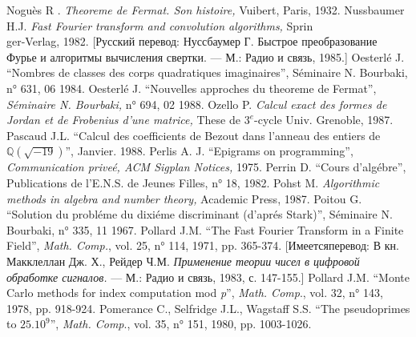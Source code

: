 \documentclass{mai_book}
\begin{document}
\noindent [136] Nogu\`{e}s R . {\itshape Theoreme de Fermat. Son histoire,} Vuibert, Paris, 1932.
\newline
[137] Nussbaumer H.J. {\itshape Fast Fourier transform and convolution algorithms,} Sprin\\ger-Verlag, 1982. [Русский перевод: Нуссбаумер Г. Быстрое преобразование Фурье и алгоритмы вычисления свертки. — М.: Радио и связь, 1985.]
\newline
[138] Oesterl\'{e} J. “Nombres de classes des corps quadratiques imaginaires”, S\'{e}minaire N. Bourbaki, n° 631, 06 1984.
\newline
\noindent[139] Oesterl\'{e} J. “Nouvelles approches du theoreme de Fermat”, {\itshape S\'{e}minaire N. Bourbaki,} n° 694, 02 1988.
\newline
[140] Ozello P. {\itshape Calcul exact des formes de Jordan et de Frobenius d’une matrice,} These de $3^{e}$-cycle Univ. Grenoble, 1987.
\newline
\noindent [141] Pascaud J.L. “Calcul des coefficients de Bezout dans l’anneau des entiers de $\mathbb{Q}(\sqrt{-19})$”, Janvier. 1988.
\newline
[142] Perlis A. J. “Epigrams on programming”, {\itshape Communication prive\'{e}, ACM Sigplan Notices,} 1975.
\newline
\noindent [143] Perrin D. “Cours d’alg\'{e}bre”, Publications de l’E.N.S. de Jeunes Filles, n° 18, 1982.
\newline
\noindent [144] Pohst M. {\itshape Algorithmic methods in algebra and number theory,} Academic Press, 1987.
\newline
[145] Poitou G. “Solution du probl\'{e}me du dixi\'{e}me discriminant (d’apr\'{e}s Stark)”, S\'{e}minaire N. Bourbaki, n° 335, 11 1967.
\newline
[146] Pollard J.M.  “The Fast Fourier Transform in a Finite Field”, {\itshape Math. Comp.}, vol. 25, n° 114, 1971, pp. 365-374. [Имеетсяперевод: В кн. Макклеллан Дж. Х., Рейдер Ч.М. {\itshape Применение теории чисел в цифровой обработке сигналов.} — М.: Радио и связь, 1983, с. 147-155.]
\newline
[147]  Pollard J.M. “Monte Carlo methods for index computation mod {\itshape p}”, {\itshape Math. Comp}., vol. 32, n° 143, 1978, pp. 918-924.
\newline
[148] Pomerance C., Selfridge J.L., Wagstaff S.S. “The pseudoprimes to $25.10^{9}$”, {\itshape Math. Comp}., vol. 35, n° 151, 1980, pp. 1003-1026.
\newline
\end{document}
